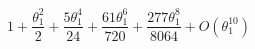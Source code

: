 \documentclass{article}
\begin{document}
\[
1 + \frac{\theta_{1}^{2}}{2} + \frac{5 \theta_{1}^{4}}{24} + \frac{61 \theta_{1}^{6}}{720} + \frac{277 \theta_{1}^{8}}{8064} + O\left(\theta_{1}^{10}\right)
\]
\end{document}
